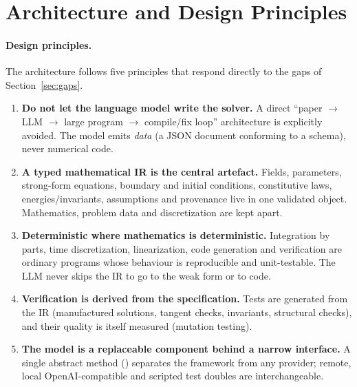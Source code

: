 \section{Architecture and Design Principles}
\label{sec:overview}

\paragraph{Design principles.}
The architecture follows five principles that respond directly to the gaps of Section~\ref{sec:gaps}.
\begin{enumerate}[label=\textbf{P\arabic*.},leftmargin=*]
\item \textbf{Do not let the language model write the solver.} A direct ``paper $\to$ LLM $\to$ large \dealii{} program $\to$ compile/fix loop'' architecture is explicitly avoided. The model emits \emph{data} (a JSON document conforming to a schema), never numerical code.
\item \textbf{A typed mathematical IR is the central artefact.} Fields, parameters, strong-form equations, boundary and initial conditions, constitutive laws, energies/invariants, assumptions and provenance live in one validated object. Mathematics, problem data and discretization are kept apart.
\item \textbf{Deterministic where mathematics is deterministic.} Integration by parts, time discretization, linearization, code generation and verification are ordinary programs whose behaviour is reproducible and unit-testable. The LLM never skips the IR to go to the weak form or to code.
\item \textbf{Verification is derived from the specification.} Tests are generated from the IR (manufactured solutions, tangent checks, invariants, structural checks), and their quality is itself measured (mutation testing).
\item \textbf{The model is a replaceable component behind a narrow interface.} A single abstract method () separates the framework from any provider; remote, local OpenAI-compatible and scripted test doubles are interchangeable.
\end{enumerate}

